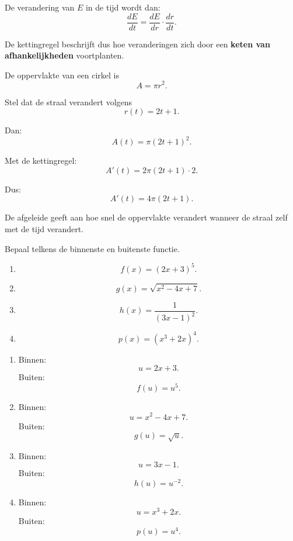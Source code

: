 \documentclass{ximera}
\begin{document}
De verandering van $E$ in de tijd wordt dan:
\[\boxed{\frac{dE}{dt}=\frac{dE}{dr}\cdot\frac{dr}{dt}.}\]

De kettingregel beschrijft dus hoe veranderingen zich door een
\textbf{keten van afhankelijkheden} voortplanten.


\begin{voorbeeld}
De oppervlakte van een cirkel is
\[A=\pi r^2.\]

Stel dat de straal verandert volgens
\[r(t)=2t+1.\]

Dan:
\[A(t)=\pi(2t+1)^2.\]

Met de kettingregel:
\[
A'(t)
=
2\pi(2t+1)\cdot2.
\]

Dus:
\[\boxed{A'(t)=4\pi(2t+1).}\]

De afgeleide geeft aan hoe snel de oppervlakte verandert wanneer de
straal zelf met de tijd verandert.
\end{voorbeeld}




\begin{oefening}{\oefB\ESS}

Bepaal telkens de binnenste en buitenste functie.

\begin{enumerate}
  \item \[f(x)=(2x+3)^5.\]
  \item \[g(x)=\sqrt{x^2-4x+7}.\]
  \item \[h(x)=\frac{1}{(3x-1)^2}.\]
  \item \[p(x)=\left(x^3+2x\right)^4.\]
\end{enumerate}

\begin{oplossing}
\begin{enumerate}
  \item Binnen:
        \[u=2x+3.\]
        Buiten:
        \[f(u)=u^5.\]

  \item Binnen:
        \[u=x^2-4x+7.\]
        Buiten:
        \[g(u)=\sqrt{u}.\]

  \item Binnen:
        \[u=3x-1.\]
        Buiten:
        \[h(u)=u^{-2}.\]

  \item Binnen:
        \[u=x^3+2x.\]
        Buiten:
        \[p(u)=u^4.\]
\end{enumerate}
\end{oplossing}
\end{oefening}
\end{document}
